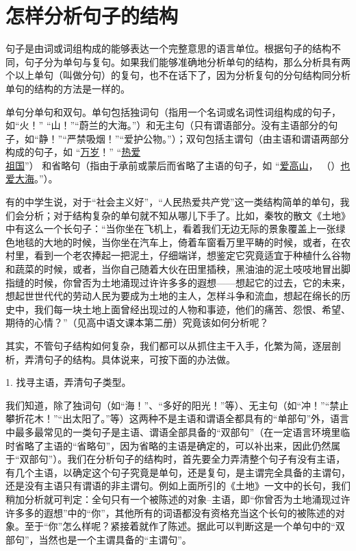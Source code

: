 \section{怎样分析句子的结构}

句子是由词或词组构成的能够表达一个完整意思的语言单位。根据句子的结构不同，句子分为单句与复句。如果我们能够准确地分析单句的结构，那么分析具有两个以上单句（叫做分句）的复句，也不在话下了，因为分析复句的分句结构同分析单句的结构的方法是一样的。

单句分单句和双句。单句包括独词句（指用一个名词或名词性词组构成的句子，如“火！” “山！”“蔚兰的大海。”）和无主句（只有谓语部分。没有主语部分的句子，如“静！”“严禁吸烟！”“爱护公物。”）；双句包括主谓句（由主语和谓语两部分构成的句子，如
“\underline{万岁}！”
“\uline{热爱\\祖国}”）
和省略句（指由于承前或蒙后而省略了主语的句子，如
“\underline{爱高山}，
（）\underline{也爱大海}。”）。

有的中学生说，对于“社会主义好”，“人民热爱共产党”这一类结构简单的单句，我们会分析；对于结构复杂的单句就不知从哪儿下手了。比如，秦牧的散文《土地》中有这么一个长句子：“当你坐在飞机上，看着我们无边无际的景象覆盖上一张绿色地毯的大地的时候，当你坐在汽车上，倚着车窗看万里平畴的时候，或者，在农村里，看到一个老农捧起一把泥土，仔细端详，想鉴定它究竟适宜于种植什么谷物和蔬菜的时候，或者，当你自己随着大伙在田里插秧，黑油油的泥土吱吱地冒出脚指缝的时候，你曾否为土地涌现过许许多多的遐想——想起它的过去，它的未来，想起世世代代的劳动人民为要成为土地的主人，怎样斗争和流血，想起在绵长的历史中，我们每一块土地上面曾经出现过的人物和事迹，他们的痛苦、怨恨、希望、期待的心情？”（见高中语文课本第二册）究竟该如何分析呢？

其实，不管句子结构如何复杂，我们都可以从抓住主干入手，化繁为简，逐层剖析，弄清句子的结构。具体说来，可按下面的办法做。

1. 找寻主语，弄清句子类型。

我们知道，除了独词句（如“海！”、“多好的阳光！”等）、无主句（如“冲！”“禁止攀折花木！”“出太阳了。”等）这两种不是主语和谓语全都具有的“单部句”外，语言中最多最常见的一类句子是主语、谓语全部具备的“双部句”（在一定语言环境里临时省略了主语的“省略句”，因为省略的主语是确定的，可以补出来，因此仍然属于“双部句”）。我们在分析句子的结构时，首先要全力弄清整个句子有没有主语，有几个主语，以确定这个句子究竟是单句，还是复句，是主谓完全具备的主谓句，还是没有主语只有谓语的非主谓句。例如上面所引的《土地》一文中的长句，我们稍加分析就可判定：全句只有一个被陈述的对象--主语，即“你曾否为土地涌现过许许多多的遐想”中的“你”，其他所有的词语都没有资格充当这个长句的被陈述的对象。至于“你”怎么样呢？紧接着就作了陈述。据此可以判断这是一个单句中的“双部句”，当然也是一个主谓具备的“主谓句”。


